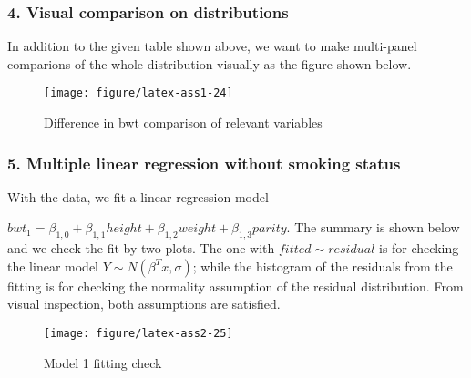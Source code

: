 \documentclass{article}\usepackage{graphicx, color}
\makeatletter
\def\maxwidth{ %
  \ifdim\Gin@nat@width>\linewidth
    \linewidth
  \else
    \Gin@nat@width
  \fi
}
\newenvironment{knitrout}{}{} %
\makeatother
\begin{document}
\subsubsection*{4. Visual comparison on distributions}
\hspace{12 pt} In addition to the given table shown above, we want to
make multi-panel comparions of the whole distribution visually as the
figure shown below. 

\begin{knitrout}
\color{fgcolor}\begin{figure}[]


{\centering \texttt{[image: figure/latex-ass1-24]} 

}

\caption[Difference  in bwt comparison of relevant variables]{Difference  in bwt comparison of relevant variables\label{fig:ass1-24}}
\end{figure}


\end{knitrout}


\subsubsection*{5. Multiple linear regression without smoking status}
\hspace{12 pt} With the data, we fit a linear regression model


\hspace{24 pt}
$bwt_1 = \beta_{1,0} + \beta_{1,1}height + \beta_{1,2}weight + \beta_{1,3}parity$. \newline
The summary is shown below and we check the fit by two plots. The one
with $fitted \sim residual$ is for checking the linear model $Y \sim
N(\beta^Tx,\sigma)$; while the histogram of the residuals from the
fitting is for checking the normality assumption of the residual
distribution. From visual inspection, both assumptions are satisfied.

\begin{knitrout}
\color{fgcolor}\begin{figure}[]


{\centering \texttt{[image: figure/latex-ass2-25]} 

}

\caption[Model 1 fitting check]{Model 1 fitting check\label{fig:ass2-25}}
\end{figure}


\end{knitrout}
\end{document}
